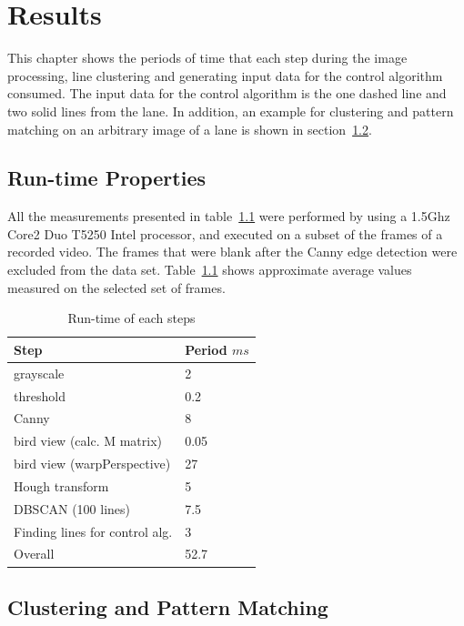 \documentclass[Report.tex]{subfiles}
\begin{document}
\chapter{Results}
\label{chapter:Results}
This chapter shows the periods of time that each step during the image
processing, line clustering and generating input data for the control algorithm
consumed. The input data for the control algorithm is the one dashed
line and two solid lines from the lane. In addition,  an example for clustering
and pattern matching on an arbitrary image of a lane is shown in
section~\ref{sec:Clustering and Pattern Matching}.

\section{Run-time Properties} %
\label{sec:Run-time Properties}

All the measurements presented in table~\ref{tab:result} were performed by
using a 1.5Ghz Core2 Duo T5250 Intel processor, and executed on a
subset of the frames of a recorded video.  The frames that were blank after the
Canny edge detection were excluded from the data set. Table~\ref{tab:result}
shows approximate average values measured on the selected set of frames.

\begin{table}[h]
  \Large
  \caption{Run-time of each steps}
  \centering
  \begin{tabular}{l l}
    Step       & Period $ms$\\ \hline
    grayscale  & 2         \\
    threshold  & 0.2       \\
    Canny      & 8         \\
    bird view (calc. M matrix) & 0.05 \\
    bird view (warpPerspective)& 27   \\
    Hough transform & 5    \\
    DBSCAN (100 lines)& 7.5 \\
    Finding lines for control alg. & 3 \\ \hline
    Overall & 52.7
  \end{tabular}
  \label{tab:result}
\end{table}

\section{Clustering and Pattern Matching} %
\label{sec:Clustering and Pattern Matching}
\end{document}
